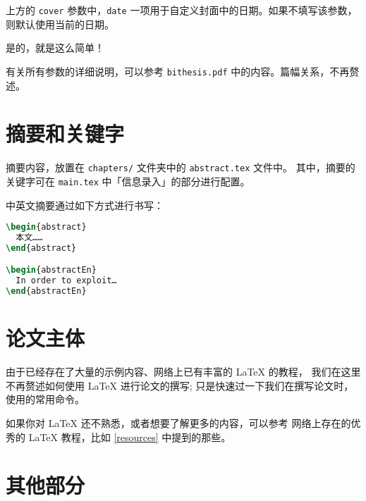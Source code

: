 上方的 \texttt{cover} 参数中，\texttt{date} 一项用于自定义封面中的日期。如果不填写该参数，
则默认使用当前的日期。

是的，就是这么简单！

有关所有参数的详细说明，可以参考 \texttt{bithesis.pdf} 中的内容。篇幅关系，不再赘述。

\section{摘要和关键字}

摘要内容，放置在 \texttt{chapters/} 文件夹中的 \texttt{abstract.tex} 文件中。
其中，摘要的关键字可在 \texttt{main.tex} 中「信息录入」的部分进行配置。

中英文摘要通过如下方式进行书写：

\begin{lstlisting}[language=TeX]
\begin{abstract}
  本文……
\end{abstract}

\begin{abstractEn}
  In order to exploit…
\end{abstractEn}
\end{lstlisting}


\section{论文主体}

由于已经存在了大量的示例内容、网络上已有丰富的 \LaTeX{} 的教程，
我们在这里不再赘述如何使用 \LaTeX{} 进行论文的撰写;
只是快速过一下我们在撰写论文时，使用的常用命令。

如果你对 \LaTeX{} 还不熟悉，或者想要了解更多的内容，可以参考
网络上存在的优秀的 \LaTeX{} 教程，比如 \ref{resources} 中提到的那些。

\section{其他部分}

